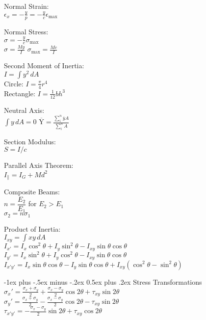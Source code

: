 \documentclass[10pt,landscape]{article}
\makeatletter
\renewcommand{\section}{\@startsection{section}{1}{0mm}%
                                {-1ex plus -.5ex minus -.2ex}%
                                {0.5ex plus .2ex}%
                                {\normalfont\large\bfseries}}
\newcommand{\tab}{\hspace{.02\textwidth}}
\newcommand{\ds}{\displaystyle}
\makeatother
\begin{document}
\begin{multicols}{3}
Normal Strain:\\
\vspace{1mm}
\tab $\ds \epsilon_{x} = -\frac{y}{p} = -\frac{y}{c}\epsilon_{\text{max}}$

Normal Stress:\\
\vspace{1mm}
\tab $\ds \sigma = -\frac{y}{c}\sigma_{\text{max}}$\\
\vspace{1mm}
\tab $\ds \sigma = \frac{My}{I}$
\tab $\ds \sigma_{\text{max}} = \frac{Mc}{I}$

Second Moment of Inertia:\\
\tab $I = \int y^2\,dA$\\
\tab Circle: $\ds I = \frac{\pi}{4}r^4$\\
\tab Rectangle: $\ds I = \frac{1}{12}bh^3$

Neutral Axis:\\
\tab $\int y\,dA = 0$
\tab $\overline{\text{Y}}=\frac{\sum_i^n\overline{y}A}{\sum_i^nA}$

Section Modulus:\\
\tab $S = I/c$

Parallel Axis Theorem:\\
\tab $I_{\parallel} = I_G + Md^2$

Composite Beams:\\
\tab $n = \dfrac{E_2}{E_1}$ for $E_2 > E_1$\\
\vspace{1mm}
\tab $\sigma_2 = n \sigma_1$

Product of Inertia:\\
\tab $I_{xy} = \int xy\,dA$\\
\tab $I_{x'} = I_x \cos^2\theta + I_y\sin^2\theta - I_{xy}\sin\theta\cos\theta$\\
\tab $I_{y'} = I_x \sin^2\theta + I_y\cos^2\theta - I_{xy}\sin\theta\cos\theta$\\
\tab $I_{x'y'} = I_x\sin\theta\cos\theta-I_y\sin\theta\cos\theta+I_{xy}(\cos^2\theta-\sin^2\theta)$

\section{Stress Transformations}
\tab $\ds \sigma_x' = \frac{\sigma_x + \sigma_y}{2}	+ \frac{\sigma_x - \sigma_y}{2}\cos2\theta + \tau_{xy}\sin2\theta$
\\[2mm]
\tab $\ds \sigma_y' = \frac{\sigma_x + \sigma_y}{2}	- \frac{\sigma_x - \sigma_y}{2}\cos2\theta - \tau_{xy}\sin2\theta$
\\[2mm]
\tab $\ds \tau_{x'y'} = -\frac{\sigma_x - \sigma_y}{2}\sin2\theta + \tau_{xy}\cos2\theta$


\end{multicols}
\end{document}
